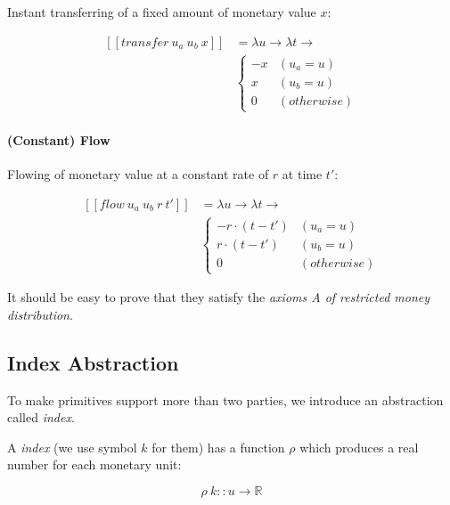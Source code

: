 Instant transferring of a fixed amount of monetary value $x$:

\begin{equation}
    \begin{split}
        [\![transfer\ u_a\ u_b\ x]\!] &=
        \lambda u \rightarrow \lambda t \rightarrow \\
        &\begin{cases}
            -x & (u_a = u) \\
             x & (u_b = u) \\
             0 & (otherwise)
        \end{cases}
    \end{split}
\end{equation}

\paragraph{(Constant) Flow}

Flowing of monetary value at a constant rate of $r$ at time $t'$:

\begin{equation}
    \begin{split}
        [\![flow\ u_a\ u_b\ r\ t']\!] &=
        \lambda u \rightarrow \lambda t \rightarrow \\
        &\begin{cases}
            -r \cdot (t - t') & (u_a = u) \\
             r \cdot (t - t') & (u_b = u) \\
                            0 & (otherwise)
        \end{cases}
    \end{split}
\end{equation}

It should be easy to prove that they satisfy the \textit{axioms A of restricted money distribution}.

\subsection{Index Abstraction}

To make primitives support more than two parties, we introduce an abstraction called \textit{index}.

A \textit{index} (we use symbol $k$ for them) has a function $\rho$ which produces a real number for
each monetary unit:

\begin{equation}
    \rho\ k :: u \rightarrow \mathbb{R}
\end{equation}

